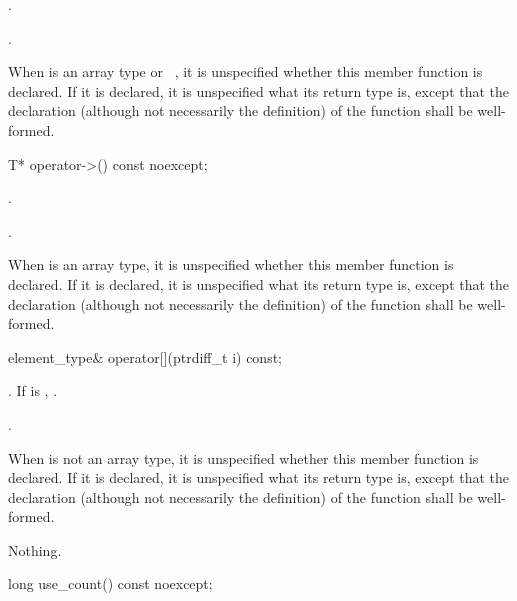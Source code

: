 \begin{itemdescr}
\pnum
\expects
{}.

\pnum
\returns
{}.

\pnum
\remarks
When  is an array type or \cv{}~,
it is unspecified whether this
member function is declared. If it is declared, it is unspecified what its
return type is, except that the declaration (although not necessarily the
definition) of the function shall be well-formed.
\end{itemdescr}

%
\begin{itemdecl}
T* operator->() const noexcept;
\end{itemdecl}

\begin{itemdescr}
\pnum
\expects
{}.

\pnum
\returns
{}.

\pnum
\remarks
When  is an array type,
it is unspecified whether this member function is declared.
If it is declared, it is unspecified what its return type is,
except that the declaration (although not necessarily the definition)
of the function shall be well-formed.
\end{itemdescr}

%
\begin{itemdecl}
element_type& operator[](ptrdiff_t i) const;
\end{itemdecl}

\begin{itemdescr}
\pnum
\expects
{}.
If  is , .

\pnum
\returns
{}.

\pnum
\remarks
When  is not an array type,
it is unspecified whether this member function is declared.
If it is declared, it is unspecified what its return type is,
except that the declaration (although not necessarily the definition)
of the function shall be well-formed.

\pnum
\throws
Nothing.
\end{itemdescr}

%
\begin{itemdecl}
long use_count() const noexcept;
\end{itemdecl}

